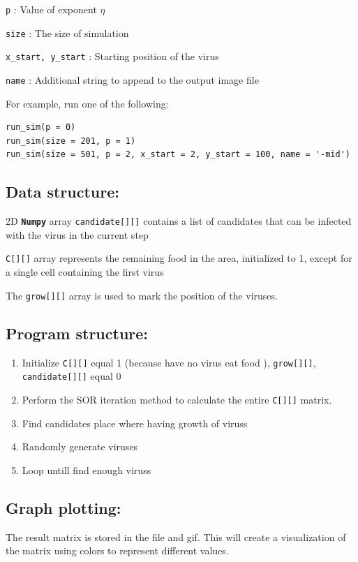 \documentclass[a4paper,10pt,notitlepage]{article}
\begin{document}
{{{{\texttt{p} : Value of exponent $\eta$

\texttt{size} : The size of simulation

\texttt{x\_start, y\_start} : Starting position of the virus

\texttt{name} : Additional string to append to the output image file

For example, run one of the following:
\begin{lstlisting}
run_sim(p = 0)
run_sim(size = 201, p = 1)
run_sim(size = 501, p = 2, x_start = 2, y_start = 100, name = '-mid')
\end{lstlisting}

\newpage
\subsection{Data structure:}
    \vspace{-0.8cm}
    \hspace{1 cm}

2D \texttt{\textbf{Numpy}} array \texttt{candidate[][]} contains a list of candidates that can be infected with the virus in the current step

\texttt{C[][]} array represents the remaining food in the area, initialized to 1, except for a single cell containing the first virus

The \texttt{grow[][]} array is used to mark the position of the viruses.

\subsection {Program structure:}
    \vspace{-0.5cm}
    \hspace{1 cm}
\begin{enumerate}
        \item Initialize \texttt{C[][]} equal 1 (because have no virus eat food ), \texttt{grow[][]}, \texttt{candidate[][]} equal 0 
        \item Perform the SOR iteration method to calculate the entire \texttt{C[][]} matrix.
        \item Find candidates place where having growth of viruss
        \item Randomly generate viruses
        \item Loop untill find enough viruss 
    \end{enumerate}
\vspace{0.5cm}
\subsection{Graph plotting:}
    \vspace{-0.5cm}
    \hspace{1 cm} 
    The result matrix is stored in the file and gif.
This will create a visualization of the matrix using colors to represent different values.
}
\vspace{1.5 cm}
}}}
\end{document}
